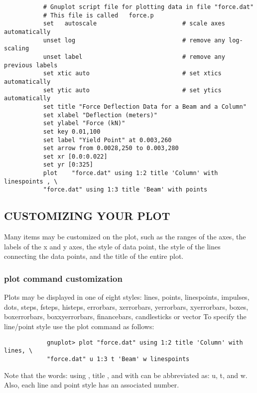	 \begin{verbatim}
	       # Gnuplot script file for plotting data in file "force.dat"
	       # This file is called   force.p
	       set   autoscale                        # scale axes automatically
	       unset log                              # remove any log-scaling
	       unset label                            # remove any previous labels
	       set xtic auto                          # set xtics automatically
	       set ytic auto                          # set ytics automatically
	       set title "Force Deflection Data for a Beam and a Column"
	       set xlabel "Deflection (meters)"
	       set ylabel "Force (kN)"
	       set key 0.01,100
	       set label "Yield Point" at 0.003,260
	       set arrow from 0.0028,250 to 0.003,280
	       set xr [0.0:0.022]
	       set yr [0:325]
	       plot    "force.dat" using 1:2 title 'Column' with linespoints , \
	       "force.dat" using 1:3 title 'Beam' with points
	 \end{verbatim}
	 
	 \subsection{CUSTOMIZING YOUR PLOT }
	 Many items may be customized on the plot, such as the ranges of the axes, the labels of the x and y axes, the style of data point, the style of the lines connecting the data points, and the title of the entire plot. 
	 \subsubsection{plot command customization }
	  Plots may be displayed in one of eight styles: lines, points, linespoints, impulses, dots, steps, fsteps, histeps, errorbars, xerrorbars, yerrorbars, xyerrorbars, boxes, boxerrorbars, boxxyerrorbars, financebars, candlesticks or vector To specify the line/point style use the plot command as follows: \\
	  \begin{verbatim}
	        gnuplot> plot "force.dat" using 1:2 title 'Column' with lines, \
	        "force.dat" u 1:3 t 'Beam' w linespoints
	  \end{verbatim}
	  Note that the words: using , title , and with can be abbreviated as: u, t, and w. Also, each line and point style has an associated number. 
